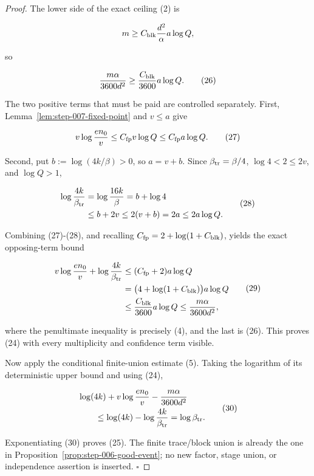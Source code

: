 \begin{proof}
The lower side of the exact ceiling (2) is

\[
 m\ge C_{\rm blk}\frac{d^2}{\alpha}a\log Q,
\]

so

\[
 \frac{m\alpha}{3600d^2}
 \ge\frac{C_{\rm blk}}{3600}a\log Q.
\tag{26}
\]

The two positive terms that must be paid are controlled separately. First,
Lemma~\ref{lem:step-007-fixed-point} and \(v\le a\) give

\[
 v\log\frac{en_0}{v}
 \le C_{\rm fp}v\log Q
 \le C_{\rm fp}a\log Q.
\tag{27}
\]

Second, put \(b:=\log(4k/\beta)>0\), so \(a=v+b\). Since
\(\beta_{\rm tr}=\beta/4\), \(\log4<2\le2v\), and
\(\log Q>1\),

\[
\begin{aligned}
 \log\frac{4k}{\beta_{\rm tr}}
 &=\log\frac{16k}{\beta}=b+\log4\\
 &\le b+2v\le2(v+b)=2a\le2a\log Q.
\end{aligned}
\tag{28}
\]

Combining (27)-(28), and recalling
\(C_{\rm fp}=2+\log(1+C_{\rm blk})\), yields the exact opposing-term
bound

\[
\begin{aligned}
 v\log\frac{en_0}{v}
 +\log\frac{4k}{\beta_{\rm tr}}
 &\le(C_{\rm fp}+2)a\log Q\\
 &=\bigl(4+\log(1+C_{\rm blk})\bigr)a\log Q\\
 &\le\frac{C_{\rm blk}}{3600}a\log Q
 \le\frac{m\alpha}{3600d^2},
\end{aligned}
\tag{29}
\]

where the penultimate inequality is precisely (4), and the last is (26).
This proves (24) with every multiplicity and confidence term visible.

Now apply the  conditional finite-union estimate (5). Taking the
logarithm of its deterministic upper bound and using (24),

\[
\begin{aligned}
 &\log(4k)+v\log\frac{en_0}{v}
   -\frac{m\alpha}{3600d^2}\\
 &\qquad\le
 \log(4k)-\log\frac{4k}{\beta_{\rm tr}}
 =\log\beta_{\rm tr}.
\end{aligned}
\tag{30}
\]

Exponentiating (30) proves (25). The finite trace/block union is already
the one in Proposition~\ref{prop:step-006-good-event}; no new
factor, stage union, or independence assertion is inserted. \(\square\)


\end{proof}

